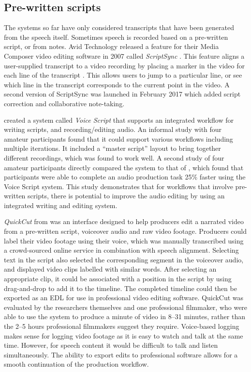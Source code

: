 \clearpage
\subsection{Pre-written scripts}
The systems so far have only considered transcripts that have been generated from the speech itself. Sometimes
speech is recorded based on a pre-written script, or from notes.  Avid Technology released a feature for their Media
Composer video editing software in 2007 called \textit{ScriptSync} \citep{Avid2011}.  This feature aligns a
user-supplied transcript to a video recording by placing a marker in the video for each line of the transcript
\citep{Griggs2007}. This allows users to jump to a particular line, or see which line in the transcript corresponds to the
current point in the video.  A second version of ScriptSync was launched in February 2017 \citep{Avid2017} which added
script correction and collaborative note-taking.

\citet{Shin2016} created a system called \textit{Voice Script} that supports an integrated workflow for writing
scripts, and recording/editing audio. An informal study with four amateur participants found that it could support
various workflows including multiple iterations. It included a ``master script'' layout to bring together
different recordings,  which was found to work well.  A second study of four amateur participants directly compared
the system to that of \citet{Rubin2013}, which found that participants were able to complete an audio production task
25\% faster using the Voice Script system.  This study demonstrates that for workflows that involve pre-written
scripts, there is potential to improve the audio editing by using an integrated writing and editing system.

\textit{QuickCut} from \citet{Truong2016} was an interface designed to help producers edit a narrated video from a
pre-written script, voiceover audio and raw video footage.  Producers could label their video footage using their
voice, which was manually transcribed using a crowd-sourced online service in combination with speech alignment.
Selecting text in the script also selected the corresponding segment in the voiceover audio, and displayed video clips
labelled with similar words. After selecting an appropriate clip, it could be associated with a position in the script
by using drag-and-drop to add it to the timeline.  The completed timeline could then be exported as an EDL for use in
professional video editing software.  QuickCut was evaluated by the researchers themselves and one professional
filmmaker, who were able to use the system to produce a minute of video in 8--31 minutes, rather than the 2--5 hours
professional filmmakers suggest they require.  Voice-based logging makes sense for logging video footage as it is easy
to watch and talk at the same time. However, for speech content it would be difficult to talk and listen
simultaneously.  The ability to export edits to professional software allows for a smooth continuation of the
production workflow.



